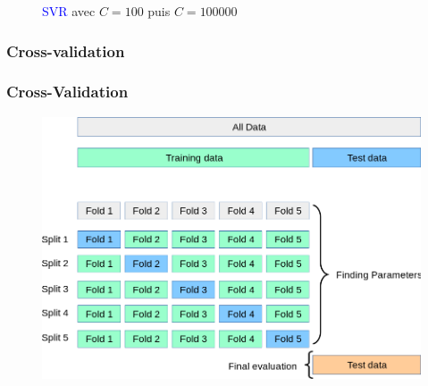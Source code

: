 \documentclass{beamer}[aspectratio = 43]
\begin{document}
\begin{frame}
\begin{figure}[h]
\begin{minipage}{0.5\textwidth}
		\end{minipage}
		\caption{\textcolor{blue}{SVR} avec $C=100$ puis $C=100000$}
	\end{figure}
\end{frame}

\subsubsection{Cross-validation}
\begin{frame}
	\frametitle{Cross-Validation}
	\begin{figure}[b]
		\centering
		\includegraphics[scale=0.3]{gscv}
	\end{figure}
\end{frame}
\end{document}

